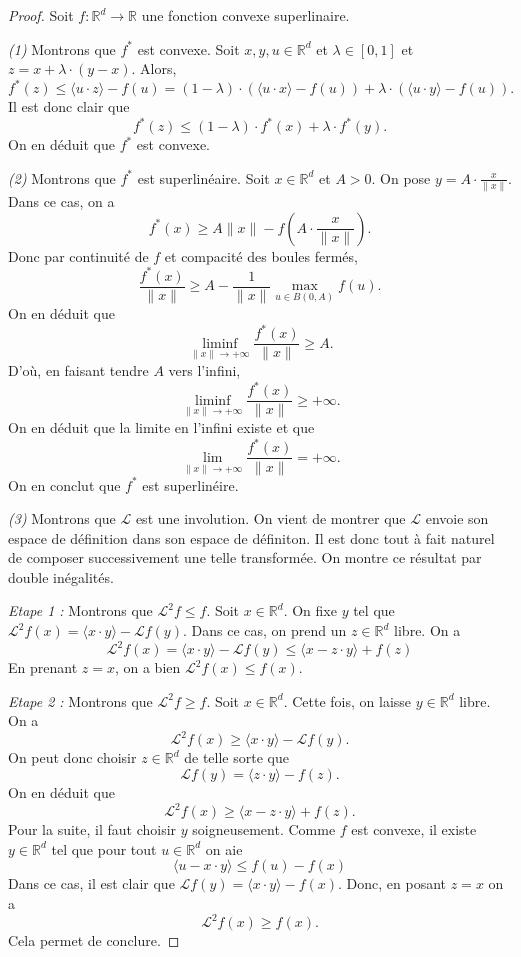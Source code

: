 \documentclass[10pt]{article}
\newcommand{\R}{\mathbb{R}}
\newcommand{\aL}{\mathcal{L}}
\begin{document}
\begin{proof}
	Soit $f : \R^d \to \R$ une fonction convexe superlinaire.

	\medskip

	\emph{(1)} Montrons que $f^*$ est convexe. Soit $x,y,u \in \R^d$ et $\lambda  \in [0,1]$ et $z  = x + \lambda \cdot (y-x)$.
	Alors,
	\[
		f^*(z) \le \langle u \cdot z\rangle - f(u) = (1-\lambda) \cdot (\langle u \cdot x \rangle - f(u)) +
		\lambda \cdot (\langle u \cdot y \rangle - f(u)).
	\]
	Il est donc clair que
	\[
		f^*(z) \le (1-\lambda) \cdot f^*(x) + \lambda \cdot f^*(y).
	\]
	On en déduit que $f^*$ est convexe.

	\medskip

	\emph{(2)} Montrons que $f^*$ est superlinéaire. Soit $x \in \R^d$ et $A > 0$. On pose
	$y = A \cdot \frac{x}{\|x\|}$. Dans ce cas, on a
	\[
		f^*(x) \ge A \|x\| - f(A \cdot \frac{x}{\|x\|}).
	\]
	Donc par continuité de $f$ et compacité des boules fermés,
	\[
		\frac{f^*(x)}{\|x\|} \ge A  - \frac{1}{\|x\|}\max_{u\in B(0,A)}f(u).
	\]
	On en déduit que
	\[
		\liminf_{\|x\| \to +\infty} \frac{f^*(x)}{\|x\|} \ge A.
	\]
	D'où, en faisant tendre $A$ vers l'infini,
	\[
		\liminf_{\|x\| \to +\infty} \frac{f^*(x)}{\|x\|} \ge +\infty.
	\]
	On en déduit que la limite en l'infini existe et que
	\[
		\lim_{\|x\| \to +\infty} \frac{f^*(x)}{\|x\|} = +\infty.
	\]
	On en conclut que $f^*$ est superlinéire.

	\medskip

	\emph{(3)} Montrons que $\aL$ est une involution. On vient de montrer que $\aL$ envoie son espace de définition
	dans son espace de définiton. Il est donc tout à fait naturel de composer successivement une telle transformée. On montre ce résultat par double inégalités.

	\emph{Etape 1 :} Montrons que $\aL^2 f \le f$. Soit $x \in \R^d$. On fixe $y$ tel que
	$\aL^2f(x) = \langle x \cdot y \rangle -\aL f (y)$. Dans ce cas, on prend un $z \in \R^d$ libre. On a
	\[
		\aL^2 f (x) = \langle x \cdot y \rangle -\aL f (y) \le \langle x - z \cdot y \rangle  +  f (z)
	\]
	En prenant $z = x$, on a bien $\aL^2 f (x) \le f(x)$.

	\medskip

	\emph{Etape 2 :} Montrons que $\aL^2 f \ge f$. Soit $x \in \R^d$. Cette fois, on laisse $y \in \R^d$ libre. On a
	\[
		\aL^2 f (x) \ge \langle x \cdot y \rangle -\aL f (y).
	\]
	On peut donc choisir $z \in \R^d$ de telle sorte que
	\[
		\aL f (y) = \langle z \cdot y \rangle - f (z).
	\]
	On en déduit que
	\[
		\aL^2 f (x) \ge \langle x-z \cdot y \rangle + f (z).
	\]
	Pour la suite, il faut choisir $y$ soigneusement. Comme $f$ est convexe, il existe $y \in \R^d$ tel que pour tout $u \in \R^d$ on aie
	\[
		\langle u-x \cdot y \rangle \le f(u) - f(x)
	\]
	Dans ce cas, il est clair que $\aL f (y) = \langle x \cdot y \rangle - f(x)$. Donc, en posant $z = x$ on a
	\[
		\aL^2 f (x) \ge f(x).
	\]
	Cela permet de conclure.
\end{proof}
\end{document}
